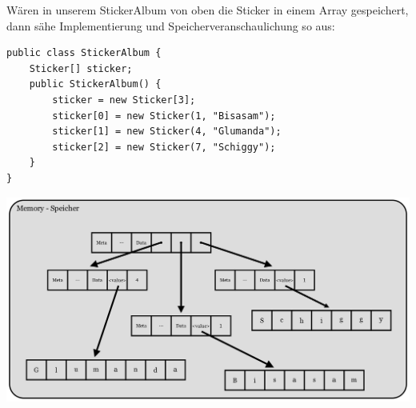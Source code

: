 \documentclass[fontsize=12pt]{article}
\begin{document}
Wären in unserem StickerAlbum von oben die Sticker in einem Array gespeichert, dann sähe Implementierung und Speicherveranschaulichung so aus: 
\begin{verbatim}
public class StickerAlbum {
    Sticker[] sticker;
    public StickerAlbum() {
        sticker = new Sticker[3];
        sticker[0] = new Sticker(1, "Bisasam");
        sticker[1] = new Sticker(4, "Glumanda");
        sticker[2] = new Sticker(7, "Schiggy");
    }
}
\end{verbatim}
\begin{center}
    \includegraphics[scale=0.15]{media/speicher.png}
\end{center}
\newpage
\end{document}
